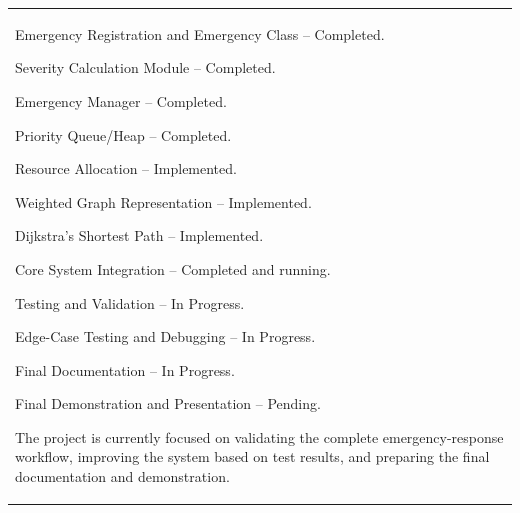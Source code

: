 \documentclass[12pt,a4paper]{article}
\newcommand{\answerbox}[2]{%
    \begin{tabularx}{\textwidth}{
        |>{\raggedright\arraybackslash}X|}
        \hline
        \parbox[t][#1][t]{\dimexpr\linewidth-12pt\relax}{
            \vspace{5pt}
            \fontsize{11}{13}\selectfont #2
        }\\
        \hline
    \end{tabularx}
}
\begin{document}
\answerbox{7.00cm}{Emergency Registration and Emergency Class -- Completed.

Severity Calculation Module -- Completed.

Emergency Manager -- Completed.

Priority Queue/Heap -- Completed.

Resource Allocation -- Implemented.

Weighted Graph Representation -- Implemented.

Dijkstra's Shortest Path -- Implemented.

Core System Integration -- Completed and running.

Testing and Validation -- In Progress.

Edge-Case Testing and Debugging -- In Progress.

Final Documentation -- In Progress.

Final Demonstration and Presentation -- Pending.

The project is currently focused on validating the complete emergency-response workflow, improving the system based on test results, and preparing the final documentation and demonstration.
}
\end{document}
